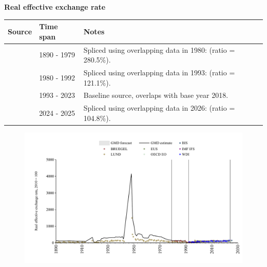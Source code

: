\documentclass[12pt,a4paper,landscape]{article}
\begin{document}
\begin{adjustbox}{max totalsize={\paperwidth}{\paperheight},center}
\begin{minipage}[t][\textheight][t]{\textwidth}
\vspace*{0.5cm}
{}
\begin{center}
{\Large\bfseries Real effective exchange rate}
\end{center}
\vspace{0.5cm}
\begin{table}[H]
\centering
\small
\begin{tabular}{|l|l|l|}
\hline
\textbf{Source} & \textbf{Time span} & \textbf{Notes} \\
\hline
\rowcolor{white}\cite{LUND}& 1890 - 1979 &Spliced using overlapping data in 1980: (ratio = 280.5\%). \\
\rowcolor{lightgray}\cite{BRUEGEL}& 1980 - 1992 &Spliced using overlapping data in 1993: (ratio = 121.1\%). \\
\rowcolor{white}\cite{WDI}& 1993 - 2023 &Baseline source, overlaps with base year 2018. \\
\rowcolor{lightgray}\cite{BIS}& 2024 - 2025 &Spliced using overlapping data in 2026: (ratio = 104.8\%). \\
\hline
\end{tabular}
\end{table}
\begin{figure}[H]
\centering
\includegraphics[width=\textwidth,height=0.6\textheight,keepaspectratio]{graphs/BGR_REER.pdf}
\end{figure}
\end{minipage}
\end{adjustbox}
\end{document}
